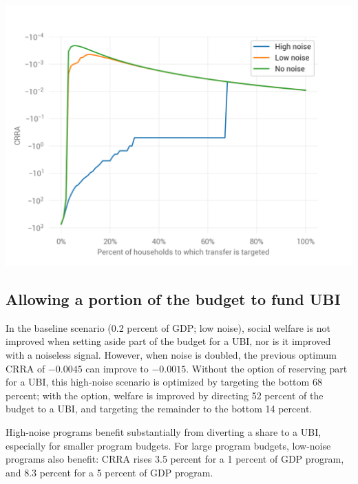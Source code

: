 \documentclass[12pt]{article}
\begin{document}
\begin{center}
	\includegraphics{by_noise_0_2_0}  %
	\label{fig:by_noise_0_2_0}
\end{center}

\subsection{Allowing a portion of the budget to fund UBI} \label{ubi_portion}

In the baseline scenario (0.2 percent of GDP; low noise), social welfare is not 
improved when setting aside part of the budget for a UBI, nor is it improved 
with a noiseless signal. However, when noise is doubled, the previous optimum 
CRRA of $-0.0045$ can improve to $-0.0015$.
Without the option of reserving part for a UBI,
this high-noise scenario is optimized by targeting the bottom 68 
percent;
with the option, welfare is improved by directing 52 percent of the 
budget to a UBI, and targeting the remainder to the bottom 14 percent.

High-noise programs benefit substantially from diverting a share to a UBI, 
especially for smaller program budgets. For large program budgets, low-noise 
programs also benefit: CRRA rises 3.5 percent for a 1 percent of GDP program, 
and 8.3 percent for a 5 percent of GDP program.
\end{document}
